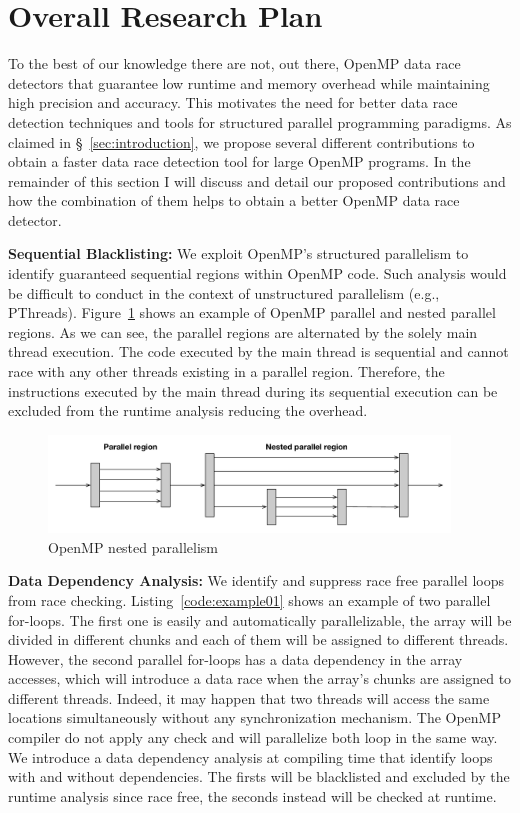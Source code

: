 \section{Overall Research Plan}
\label{sec:overallresearchplan}

To the best of our knowledge there are not, out there, OpenMP data race
detectors that guarantee low runtime and memory overhead while maintaining
high precision and accuracy.
%
This motivates the need for better data race detection techniques and tools
for structured parallel programming paradigms.
%
As claimed in \S~\ref{sec:introduction}, we propose several different
contributions to obtain a faster data race detection tool for large OpenMP
programs.
%
In the remainder of this section I will discuss and detail our proposed
contributions and how the combination of them helps to obtain a better OpenMP
data race detector.

\textbf{Sequential Blacklisting:} We exploit OpenMP's structured parallelism
to identify guaranteed sequential regions within OpenMP code.
%
Such analysis would be difficult to conduct in the context of unstructured
parallelism (e.g., PThreads).
%
Figure~\ref{fig:nested} shows an example of OpenMP parallel and nested
parallel regions.
%
As we can see, the parallel regions are alternated by the solely main thread
execution.
%
The code executed by the main thread is sequential and cannot race with any
other threads existing in a parallel region.
%
Therefore, the instructions executed by the main thread during its sequential
execution can be excluded from the runtime analysis reducing the overhead.

\begin{figure}
  \centering
  \includegraphics[width=0.95\textwidth]{figures/nested_parallelism}
  \caption{OpenMP nested parallelism}
  \label{fig:nested}
\end{figure}

\textbf{Data Dependency Analysis:} We identify and suppress race free parallel
loops from race checking.
%
Listing~\ref{code:example01} shows an example of two parallel for-loops.
%
The first one is easily and automatically parallelizable, the array will be
divided in different chunks and each of them will be assigned to different
threads.
%
However, the second parallel for-loops has a data dependency in the array
accesses, which will introduce a data race when the array's chunks are
assigned to different threads.
%
Indeed, it may happen that two threads will access the same locations
simultaneously without any synchronization mechanism.
%
The OpenMP compiler do not apply any check and will parallelize both loop in
the same way.
%
We introduce a data dependency analysis at compiling time that identify loops
with and without dependencies.
%
The firsts will be blacklisted and excluded by the runtime analysis since race
free, the seconds instead will be checked at runtime.

